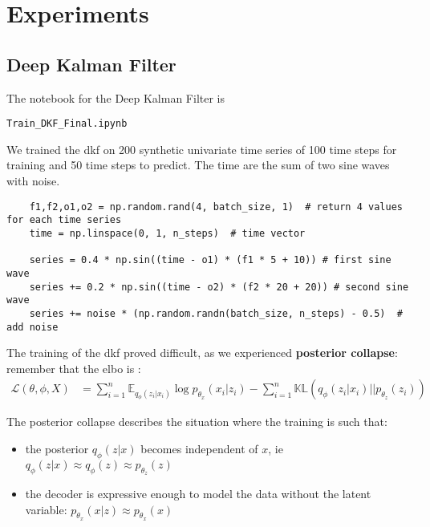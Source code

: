 \chapter{Experiments}

\section{Deep Kalman Filter}

The notebook for the Deep Kalman Filter is 

\begin{verbatim}
Train_DKF_Final.ipynb
\end{verbatim}

We trained the \gls{dkf} on 200 synthetic univariate time series of 100 time steps for training and 50 time steps to predict. 
The time are the sum of two sine waves with noise.

\begin{verbatim}
    f1,f2,o1,o2 = np.random.rand(4, batch_size, 1)  # return 4 values for each time series
    time = np.linspace(0, 1, n_steps)  # time vector
    
    series = 0.4 * np.sin((time - o1) * (f1 * 5 + 10)) # first sine wave
    series += 0.2 * np.sin((time - o2) * (f2 * 20 + 20)) # second sine wave
    series += noise * (np.random.randn(batch_size, n_steps) - 0.5)  # add noise
\end{verbatim}

The training of the \gls{dkf} proved difficult, as we experienced \textbf{posterior collapse}: remember that the \gls{elbo} 
is :
\begin{align*}
    \mathcal{L}(\theta, \phi, X) &= \sum_{i=1}^n \mathbb{E}_{q_{\phi}(z_i \vert x_i)} \log{p_{\theta_x}(x_i \vert z_i)} - \sum_{i=1}^n \mathbb{KL}(q_{\phi}(z_i \vert x_i) \vert\vert p_{\theta_z}(z_i) )
\end{align*}

The posterior collapse describes the situation where the training is such that:
\begin{itemize}
    \item the posterior $q_{\phi}(z \vert x)$ becomes independent of $x$, ie $q_{\phi}(z \vert x) \approx q_{\phi}(z) \approx p_{\theta_z}(z)$
    \item the decoder is expressive enough to model the data without the latent variable: $p_{\theta_x}(x \vert z) \approx p_{\theta_x}(x)$
\end{itemize}

